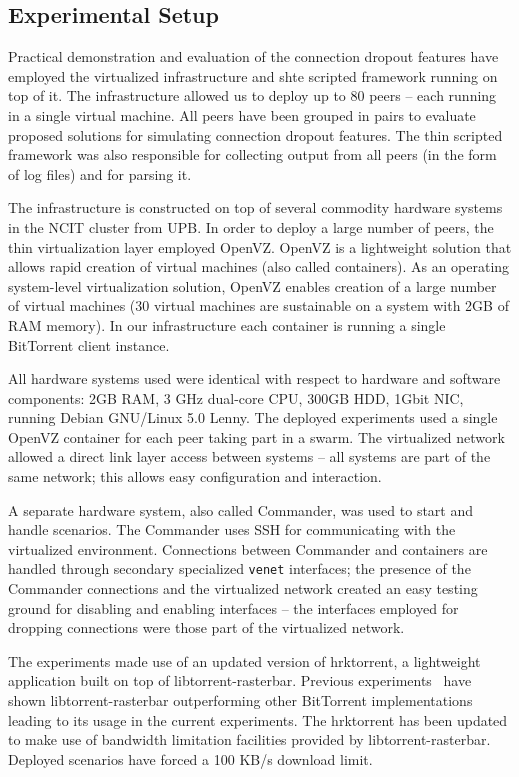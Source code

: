 \subsection{Experimental Setup}
\label{subsec:virt-infra:dropouts-setup}

Practical demonstration and evaluation of the connection dropout features
have employed the virtualized infrastructure and shte scripted framework
running on top of it. The infrastructure allowed us to deploy up to 80 peers
-- each running in a single virtual machine. All peers have been grouped in
pairs to evaluate proposed solutions for simulating connection dropout
features. The thin scripted framework was also responsible for collecting
output from all peers (in the form of log files) and for parsing it.

The infrastructure is constructed on top of several commodity hardware systems
in the NCIT cluster from UPB. In order to
deploy a large number of peers, the thin virtualization layer employed OpenVZ.
OpenVZ is a lightweight solution that allows rapid creation of
virtual machines (also called containers). As an operating system-level
virtualization solution, OpenVZ enables creation of a large number of virtual
machines (30 virtual machines are sustainable on a system with 2GB of RAM
memory). In our infrastructure each container is running a single BitTorrent
client instance.

All hardware systems used were identical with respect to hardware and software
components: 2GB RAM, 3 GHz dual-core CPU, 300GB HDD, 1Gbit NIC, running Debian
GNU/Linux 5.0 Lenny. The deployed experiments used a single OpenVZ container
for each peer taking part in a swarm. The virtualized network
allowed a direct link layer access between systems -- all systems are part of
the same network; this allows easy configuration and interaction.

A separate hardware system, also called Commander, was used to start and
handle scenarios. The Commander uses SSH for communicating with the
virtualized environment. Connections between Commander and containers are
handled through secondary specialized \texttt{venet} interfaces; the presence
of the Commander connections and the virtualized network created an easy
testing ground for disabling and enabling interfaces -- the interfaces
employed for dropping connections were those part of the virtualized network.

The experiments made use of an updated version of hrktorrent, a lightweight
application built on top of libtorrent-rasterbar. Previous
experiments~\cite{bt-vi} have shown libtorrent-rasterbar outperforming other
BitTorrent implementations leading to its usage in the current experiments.
The hrktorrent has been updated to make use of bandwidth limitation facilities
provided by libtorrent-rasterbar.  Deployed scenarios have forced a 100 KB/s
download limit.

